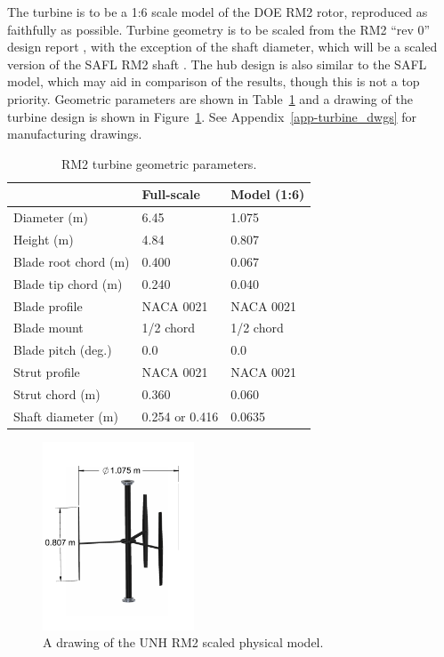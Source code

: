 \documentclass[12pt]{scrreprt}
\begin{document}
The turbine is to be a 1:6 scale model of the DOE RM2 rotor, reproduced as
faithfully as possible. Turbine geometry is to be scaled from the RM2 ``rev 0''
design report \cite{Barone2011}, with the exception of the shaft diameter, which
will be a scaled version of the SAFL RM2 shaft \cite{Hill2014}. The hub design
is also similar to the SAFL model, which may aid in comparison of the results,
though this is not a top priority. Geometric parameters are shown in
Table~\ref{tab-turb_geom} and a drawing of the turbine design is shown in
Figure~\ref{fig-turbine_drawing}. See Appendix~\ref{app-turbine_dwgs} for
manufacturing drawings.

\begin{table}[ht]
\centering
\begin{tabular}{l|l|l}
   & Full-scale & Model (1:6) \\
\hline 
Diameter (m)   & 6.45 & 1.075 \\ 
Height (m)     & 4.84 & 0.807 \\ 
Blade root chord (m) & 0.400 & 0.067 \\ 
Blade tip chord (m)  & 0.240 & 0.040 \\ 
Blade profile & NACA 0021 & NACA 0021 \\ 
Blade mount & 1/2 chord & 1/2 chord \\ 
Blade pitch (deg.) & 0.0 & 0.0 \\ 
Strut profile & NACA 0021 & NACA 0021 \\ 
Strut chord (m) & 0.360 & 0.060 \\ 
Shaft diameter (m) & 0.254 \cite{Beam2011} or 0.416 \cite{Hill2014} & 0.0635\\ 
\end{tabular}
\caption{RM2 turbine geometric parameters.}
\label{tab-turb_geom}
\end{table}

\begin{figure}[ht]
\centering
\includegraphics[width=0.4\textwidth]{Figures/turbine}
\caption{A drawing of the UNH RM2 scaled physical model.}
\label{fig-turbine_drawing}
\end{figure}
\end{document}
